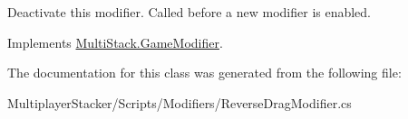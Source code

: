 Deactivate this modifier. Called before a new modifier is enabled. 



Implements \hyperlink{class_multi_stack_1_1_game_modifier_abe04db6ab31f5e5063739d8e5a3f7ad1}{Multi\+Stack.\+Game\+Modifier}.



The documentation for this class was generated from the following file\+:\begin{DoxyCompactItemize}
\item 
Multiplayer\+Stacker/\+Scripts/\+Modifiers/Reverse\+Drag\+Modifier.\+cs\end{DoxyCompactItemize}
